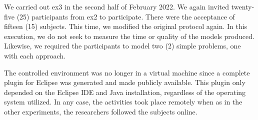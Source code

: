 We carried out \ac{ex3} in the second half of February 2022.
We again invited twenty-five (25) participants from \ac{ex2} to participate.
There were the acceptance of fifteen (15) subjects.
This time, we modified the original protocol again.
In this execution, we do not seek to measure the time or quality of the models produced.
Likewise, we required the participants to model two (2) simple problems, one with each approach.

The controlled environment was no longer in a virtual machine since a complete plugin for Eclipse was generated and made publicly available.
This plugin only depended on the Eclipse IDE and Java installation, regardless of the operating system utilized.
In any case, the activities took place remotely when as in the other experiments, the researchers followed the subjects online.

